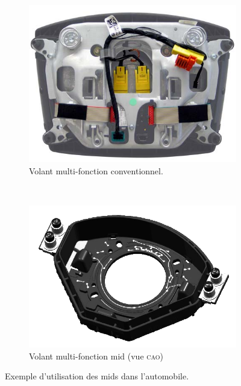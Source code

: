 \begin{figure}[h]
        \centering
        \begin{subfigure}[t]{0.4\textwidth}
                \includegraphics[width=\textwidth]{images/conventional_steering_wheel}
                \caption{Volant multi-fonction conventionnel.}
                \label{fig:conventional-wheel}
        \end{subfigure}%
        ~ 
        \begin{subfigure}[t]{0.4\textwidth}
                \includegraphics[width=\textwidth]{images/mid_steering_wheel_BnW}
                \caption{Volant multi-fonction \gls{mid} (vue \textsc{cao})}
                \label{fig:mid-wheel}
        \end{subfigure}
        \caption{Exemple d'utilisation des \glspl{mid} dans l'automobile.}\label{fig:mid-automotive-example}
\end{figure}

